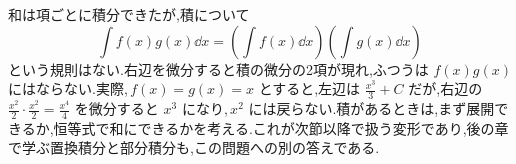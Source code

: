 和は項ごとに積分できたが,積について
\[
 \int f(x)g(x)\dd x
 =\left(\int f(x)\dd x\right)
  \left(\int g(x)\dd x\right)
\]
という規則はない.右辺を微分すると積の微分の2項が現れ,ふつうは $f(x)g(x)$ にはならない.実際,\,$f(x)=g(x)=x$ とすると,左辺は $\frac{x^3}3+C$ だが,右辺の $\frac{x^2}2\cdot\frac{x^2}2=\frac{x^4}4$ を微分すると $x^3$ になり,\,$x^2$ には戻らない.積があるときは,まず展開できるか,恒等式で和にできるかを考える.これが次節以降で扱う変形であり,後の章で学ぶ置換積分と部分積分も,この問題への別の答えである.
